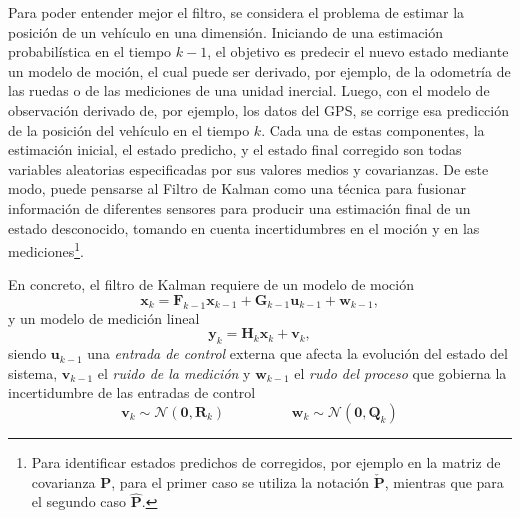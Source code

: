 Para poder entender mejor el filtro, se considera el problema de estimar la posición de un vehículo en una dimensión. Iniciando de una estimación probabilística en el tiempo $k-1$, el objetivo es predecir el nuevo estado mediante un modelo de moción, el cual puede ser derivado, por ejemplo, de la odometría de las ruedas o de las mediciones de una unidad inercial. Luego, con el modelo de observación derivado de, por ejemplo, los datos del GPS, se corrige esa predicción de la posición del vehículo en el tiempo $k$.
Cada una de estas componentes, la estimación inicial, el estado predicho, y el estado final corregido son todas variables aleatorias especificadas por sus valores medios y covarianzas. De este modo, puede pensarse al Filtro de Kalman como una técnica para fusionar información de diferentes sensores para producir una estimación final de un estado desconocido, tomando en cuenta incertidumbres en el moción y en las mediciones\footnote{Para identificar estados predichos de corregidos, por ejemplo en la matriz de covarianza $\bm{P}$, para el primer caso se utiliza la notación $\check{\bm{P}}$, mientras que para el segundo caso $\hat{\bm{P}}$.}.


En concreto, el filtro de Kalman requiere de un modelo de moción
\begin{equation}
    \bm{x}_k = \bm{F}_{k-1}\bm{x}_{k-1} + \bm{G}_{k-1}\bm{u}_{k-1} + \bm{w}_{k-1},
\end{equation}
y un modelo de medición lineal
\begin{equation}
    \bm{y}_k = \bm{H}_k\bm{x}_k + \bm{v}_k,
\end{equation}
siendo $\bm{u}_{k-1}$ una \textit{entrada de control} externa que afecta la evolución del estado del sistema, $\bm{v}_{k-1}$ el \textit{ruido de la medición} y $\bm{w}_{k-1}$ el \textit{rudo del proceso} que gobierna la incertidumbre de las entradas de control
\begin{equation}
    \bm{v}_k \sim \mathcal{N}(\bm{0},\bm{R}_k)\hspace{2cm}\bm{w}_k \sim \mathcal{N}(\bm{0},\bm{Q}_k)
\end{equation}

